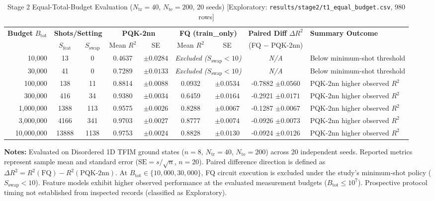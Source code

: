 \begin{table}[!t]
\caption{Stage 2 Equal-Total-Budget Evaluation ($N_{\mathrm{tr}}=40$, $N_{\mathrm{te}}=200$, 20 seeds) [Exploratory: \texttt{results/stage2/t1\_equal\_budget.csv}, 980 rows]}
\label{tab:equal_budget}
\centering
\begingroup
\small
\setlength{\tabcolsep}{3.0pt}
\begin{tabular}{@{}rcccccccl@{}}
\toprule
\textbf{Budget} $B_{\mathrm{tot}}$ & \multicolumn{2}{c}{\textbf{Shots/Setting}} & \multicolumn{2}{c}{\textbf{PQK-2nn}} & \multicolumn{2}{c}{\textbf{FQ (train\_only)}} & \textbf{Paired Diff} $\Delta R^2$ & \textbf{Summary Outcome} \\
\cmidrule(lr){2-3}\cmidrule(lr){4-5}\cmidrule(lr){6-7}\cmidrule(lr){8-8}
 & $S_{\mathrm{feat}}$ & $S_{\mathrm{swap}}$ & Mean $R^2$ & SE & Mean $R^2$ & SE & (FQ $-$ PQK-2nn) & \\
\midrule
10,000 & 13 & 0 & 0.4637 & $\pm 0.0284$ & \multicolumn{2}{c}{\textit{Excluded ($S_{\mathrm{swap}} < 10$)}} & \textit{N/A} & Below minimum-shot threshold \\
30,000 & 41 & 0 & 0.7289 & $\pm 0.0133$ & \multicolumn{2}{c}{\textit{Excluded ($S_{\mathrm{swap}} < 10$)}} & \textit{N/A} & Below minimum-shot threshold \\
100,000 & 138 & 11 & 0.8814 & $\pm 0.0088$ & 0.0932 & $\pm 0.0534$ & -0.7882 $\pm 0.0560$ & PQK-2nn higher observed $R^2$ \\
300,000 & 416 & 34 & 0.9380 & $\pm 0.0034$ & 0.6459 & $\pm 0.0164$ & -0.2921 $\pm 0.0171$ & PQK-2nn higher observed $R^2$ \\
1,000,000 & 1388 & 113 & 0.9575 & $\pm 0.0026$ & 0.8288 & $\pm 0.0067$ & -0.1287 $\pm 0.0067$ & PQK-2nn higher observed $R^2$ \\
3,000,000 & 4166 & 341 & 0.9703 & $\pm 0.0027$ & 0.8777 & $\pm 0.0074$ & -0.0926 $\pm 0.0073$ & PQK-2nn higher observed $R^2$ \\
10,000,000 & 13888 & 1138 & 0.9753 & $\pm 0.0024$ & 0.8828 & $\pm 0.0130$ & -0.0924 $\pm 0.0126$ & PQK-2nn higher observed $R^2$ \\
\bottomrule
\end{tabular}
\endgroup
\vspace{1ex}
{\raggedright \footnotesize \textbf{Notes:} Evaluated on Disordered 1D TFIM ground states ($n=8$, $N_{\mathrm{tr}}=40$, $N_{\mathrm{te}}=200$) across 20 independent seeds. Reported metrics represent sample mean and standard error ($\mathrm{SE} = s / \sqrt{n}$, $n=20$). Paired difference direction is defined as $\Delta R^2 = R^2(\mathrm{FQ}) - R^2(\mathrm{PQK\text{-}2nn})$. At $B_{\mathrm{tot}} \in \{10{,}000, 30{,}000\}$, FQ circuit execution is excluded under the study's minimum-shot policy ($S_{\mathrm{swap}} < 10$). Feature models exhibit higher observed performance at the evaluated measurement budgets ($B_{\mathrm{tot}} \le 10^7$). Prospective protocol timing not established from inspected records (classified as Exploratory).\par}
\end{table}
